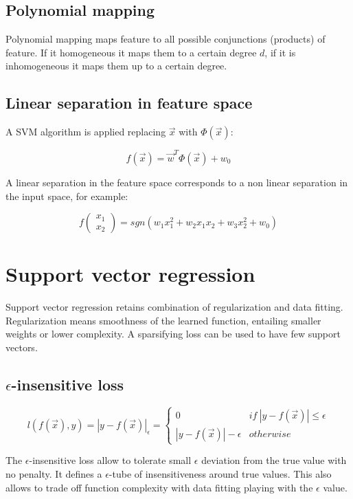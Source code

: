 	\subsection{Polynomial mapping}
	Polynomial mapping maps feature to all possible conjunctions (products) of feature.
	If it homogeneous it maps them to a certain degree $d$, if it is inhomogeneous it maps them up to a certain degree.

	\subsection{Linear separation in feature space}
	A SVM algorithm is applied replacing $\vec{x}$ with $\Phi(\vec{x})$:

	$$f(\vec{x}) = \vec{w}^T\Phi(\vec{x})+w_0$$

	A linear separation in the feature space corresponds to a non linear separation in the input space, for example:

	$$f\begin{pmatrix}x_1\\x_2\end{pmatrix} = sgn(w_1x_1^2 + w_2x_1x_2 + w_3x_2^2 + w_0)$$

\section{Support vector regression}
Support vector regression retains combination of regularization and data fitting.
Regularization means smoothness of the learned function, entailing smaller weights or lower complexity.
A sparsifying loss can be used to have few support vectors.

	\subsection{$\epsilon$-insensitive loss}

	$$l(f(\vec{x}), y) = |y-f(\vec{x})|_\epsilon = \begin{cases} 0 &if\ |y-f(\vec{x})|\le\epsilon\\ |y-f(\vec{x})|-\epsilon & otherwise\end{cases}$$

	The $\epsilon$-insensitive loss allow to tolerate small $\epsilon$ deviation from the true value with no penalty.
	It defines a $\epsilon$-tube of insensitiveness around true values.
	This also allows to trade off function complexity with data fitting playing with the $\epsilon$ value.

